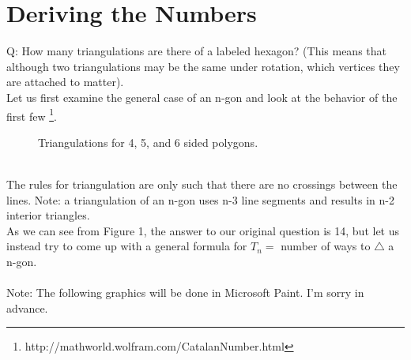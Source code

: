 
% 





% 




\section{Deriving the Numbers}
Q: How many triangulations are there of a labeled hexagon? (This means that although two triangulations may be the same under rotation, which vertices they are attached to matter).\\
Let us first examine the general case of an n-gon and look at the behavior of the first few \footnote{http://mathworld.wolfram.com/CatalanNumber.html}.\\
\begin{figure}[h]
  \caption{Triangulations for 4, 5, and 6 sided polygons.}
  \label{fig:triangs1}
\end{figure}\\
The rules for triangulation are only such that there are no crossings between the lines. Note: a triangulation of an n-gon uses n-3 line segments and results in n-2 interior triangles.\\
As we can see from Figure 1, the answer to our original question is 14, but let us instead try to come up with a general formula for $T_n = $ number of ways to $\triangle$ a n-gon.\\
\\
Note: The following graphics will be done in Microsoft Paint. I'm sorry in advance.\\


